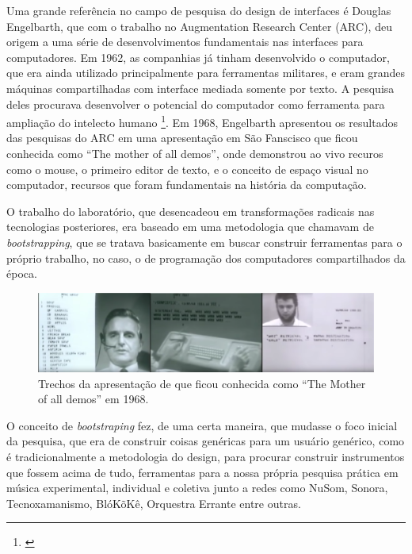 Uma grande referência no campo de pesquisa do design de interfaces é Douglas Engelbarth, que com o trabalho no Augmentation Research Center (ARC), deu origem a uma série de desenvolvimentos fundamentais nas interfaces para computadores. Em 1962, as companhias já tinham desenvolvido o computador, que era ainda utilizado principalmente para ferramentas militares, e eram grandes máquinas compartilhadas com interface mediada somente por texto. A pesquisa deles procurava desenvolver o potencial do computador como ferramenta para ampliação do intelecto humano \footnote{\cite{Engelbart1962}}. Em 1968, Engelbarth apresentou os resultados das pesquisas do ARC em uma apresentação em São Fanscisco que ficou conhecida como ``The mother of all demos'', onde demonstrou ao vivo recuros como o mouse, o primeiro editor de texto, e o conceito de espaço visual no computador, recursos que foram fundamentais na história da computação. 


O trabalho do laboratório, que desencadeou em transformações radicais nas tecnologias posteriores, era baseado em uma metodologia que chamavam de \emph{bootstrapping}, que se tratava basicamente em buscar construir ferramentas para o próprio trabalho, no caso, o de programação dos computadores compartilhados da época.  


\begin{figure}
    \caption{\label{motherofalldemos}Trechos da apresentação de que ficou conhecida como ``The Mother of all demos'' em 1968.}
    
        \includegraphics[width=1\linewidth]{pictures/cap2/mother_of_all}
    
\end{figure}



O conceito de \emph{bootstraping} fez, de uma certa maneira, que mudasse o foco inicial da pesquisa, que era de construir coisas genéricas para um usuário genérico, como é tradicionalmente a metodologia do design, para procurar construir instrumentos que fossem acima de tudo, ferramentas para a nossa própria pesquisa prática em música experimental, individual e coletiva junto a redes como NuSom, Sonora, Tecnoxamanismo, BlóKõKê, Orquestra Errante entre outras.


